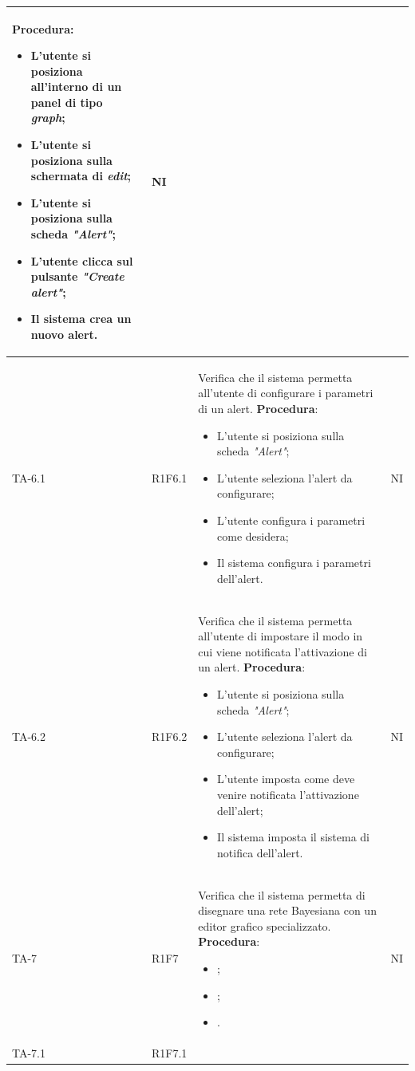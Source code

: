 \begin{longtable}{|C{2.5cm}|C{2.5cm}|L{6.5cm}|C{1.5cm}|}
	\textbf{Procedura}:
	\begin{itemize}		
		\item L'utente si posiziona all'interno di un panel di tipo \emph{graph};
		\item L'utente si posiziona sulla schermata di \emph{edit};
		\item L'utente si posiziona sulla scheda \emph{"Alert"};
		\item L'utente clicca sul pulsante \emph{"Create alert"};
		\item Il sistema crea un nuovo alert.
	\end{itemize}
	 & {NI}\\
	\hline
	{TA-6.1} & {R1F6.1} & 
	Verifica che il sistema permetta all'utente di configurare i parametri di un alert.
	\textbf{Procedura}:
	\begin{itemize}		
		\item L'utente si posiziona sulla scheda \emph{"Alert"};
		\item L'utente seleziona l'alert da configurare;
		\item L'utente configura i parametri come desidera;
		\item Il sistema configura i parametri dell'alert.
	\end{itemize}
	 & {NI}\\
	\hline
	{TA-6.2} & {R1F6.2} & 
	Verifica che il sistema permetta all'utente di impostare il modo in cui viene notificata l'attivazione di un alert.
	\textbf{Procedura}:
	\begin{itemize}		
		\item L'utente si posiziona sulla scheda \emph{"Alert"};
		\item L'utente seleziona l'alert da configurare;
		\item L'utente imposta come deve venire notificata l'attivazione dell'alert;
		\item Il sistema imposta il sistema di notifica dell'alert.
	\end{itemize}
	 & {NI}\\
	\hline
	{TA-7} & {R1F7} & 
	Verifica che il sistema permetta di disegnare una rete Bayesiana con un editor grafico specializzato.
	\textbf{Procedura}:
	\begin{itemize}		
		\item ;
		\item ;
		\item .
	\end{itemize}
	 & {NI}\\
	\hline
	{TA-7.1} & {R1F7.1} & 

\end{longtable}
